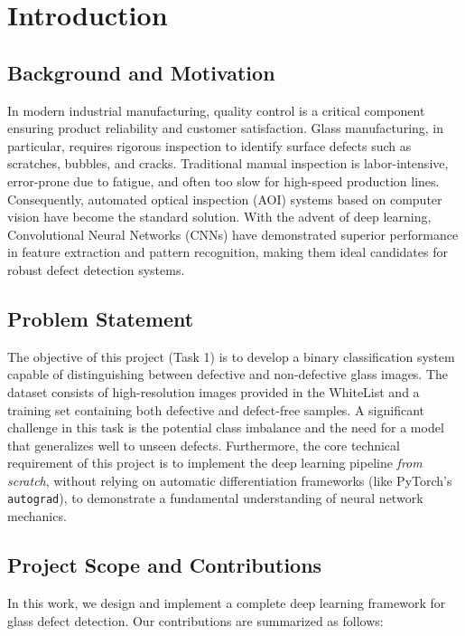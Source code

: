 \section{Introduction}

\subsection{Background and Motivation}
In modern industrial manufacturing, quality control is a critical component ensuring product reliability and customer satisfaction. Glass manufacturing, in particular, requires rigorous inspection to identify surface defects such as scratches, bubbles, and cracks. Traditional manual inspection is labor-intensive, error-prone due to fatigue, and often too slow for high-speed production lines. Consequently, automated optical inspection (AOI) systems based on computer vision have become the standard solution. With the advent of deep learning, Convolutional Neural Networks (CNNs) have demonstrated superior performance in feature extraction and pattern recognition, making them ideal candidates for robust defect detection systems.

\subsection{Problem Statement}
The objective of this project (Task 1) is to develop a binary classification system capable of distinguishing between defective and non-defective glass images. The dataset consists of high-resolution images provided in the WhiteList and a training set containing both defective and defect-free samples. A significant challenge in this task is the potential class imbalance and the need for a model that generalizes well to unseen defects. Furthermore, the core technical requirement of this project is to implement the deep learning pipeline \textit{from scratch}, without relying on automatic differentiation frameworks (like PyTorch's \texttt{autograd}), to demonstrate a fundamental understanding of neural network mechanics.

\subsection{Project Scope and Contributions}
In this work, we design and implement a complete deep learning framework for glass defect detection. Our contributions are summarized as follows:

